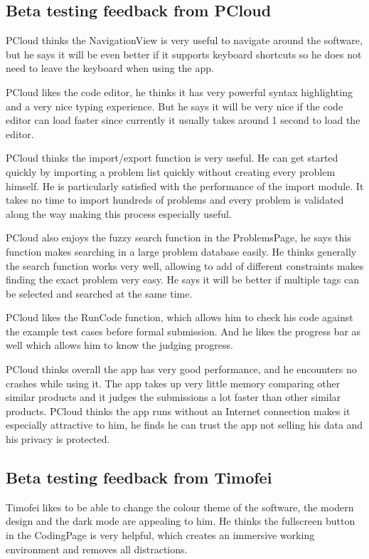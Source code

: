 \documentclass[report.tex]{subfiles}
\begin{document}
\subsection{Beta testing feedback from PCloud}

PCloud thinks the NavigationView is very useful to navigate around the software, but he says it will be even better if it supports keyboard shortcuts so he does not need to leave the keyboard when using the app.

PCloud likes the code editor, he thinks it has very powerful syntax highlighting and a very nice typing experience. But he says it will be very nice if the code editor can load faster since currently it usually takes around 1 second to load the editor.

PCloud thinks the import/export function is very useful. He can get started quickly by importing a problem list quickly without creating every problem himself. He is particularly satisfied with the performance of the import module. It takes no time to import hundreds of problems and every problem is validated along the way making this process especially useful.

PCloud also enjoys the fuzzy search function in the ProblemsPage, he says this function makes searching in a large problem database easily. He thinks generally the search function works very well, allowing to add of different constraints makes finding the exact problem very easy. He says it will be better if multiple tags can be selected and searched at the same time.

PCloud likes the RunCode function, which allows him to check his code against the example test cases before formal submission. And he likes the progress bar as well which allows him to know the judging progress.

PCloud thinks overall the app has very good performance, and he encounters no crashes while using it. The app takes up very little memory comparing other similar products and it judges the submissions a lot faster than other similar products. PCloud thinks the app runs without an Internet connection makes it especially attractive to him, he finds he can trust the app not selling his data and his privacy is protected.

\subsection{Beta testing feedback from Timofei}

Timofei likes to be able to change the colour theme of the software, the modern design and the dark mode are appealing to him. He thinks the fullscreen button in the CodingPage is very helpful, which creates an immersive working environment and removes all distractions.
\end{document}
